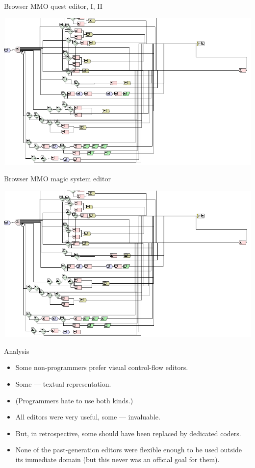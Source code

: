 \documentclass[handout]{beamer}
\begin{document}
\begin{frame}{Browser MMO quest editor, I, II}

\includegraphics[height=.8\textheight]{browser}

\end{frame}


\begin{frame}{Browser MMO magic system editor}

\includegraphics[height=.8\textheight]{browser}

\end{frame}


\begin{frame}{Analysis}

\begin{itemize}
\item Some non-programmers prefer visual control-flow editors.
\item Some — textual representation.
\item (Programmers hate to use both kinds.)
\item All editors were very useful, some — invaluable.
\item But, in retrospective, some should have been replaced by dedicated coders.
\item None of the past-generation editors were flexible enough to be
used outside its immediate domain (but this never was an official goal
for them).
\end{itemize}

\end{frame}
\end{document}
